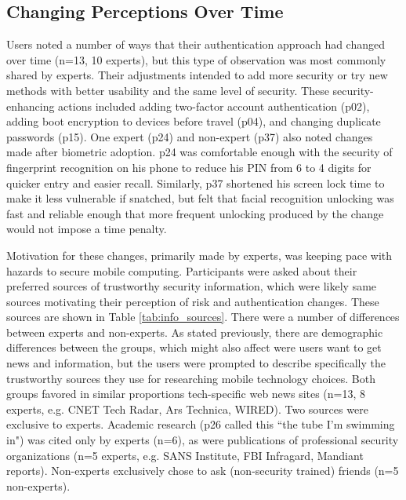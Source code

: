 \subsection{Changing Perceptions Over Time}
Users noted a number of ways that their authentication approach had changed over time (n=13, 10 experts), but this type of observation was most commonly shared by experts. Their adjustments intended to add more security or try new methods with better usability and the same level of security. These security-enhancing actions included adding two-factor account authentication (p02), adding boot encryption to devices before travel (p04), and changing duplicate passwords (p15). One expert (p24) and non-expert (p37) also noted changes made after biometric adoption. p24 was comfortable enough with the security of fingerprint recognition on his phone to reduce his PIN from 6 to 4 digits for quicker entry and easier recall. Similarly, p37 shortened his screen lock time to make it less vulnerable if snatched, but felt that facial recognition unlocking was fast and reliable enough that more frequent unlocking produced by the change would not impose a time penalty.  

Motivation for these changes, primarily made by experts, was keeping pace with hazards to secure mobile computing. Participants were asked about their preferred sources of trustworthy security information, which were likely same sources motivating their perception of risk and authentication changes. %
These sources are shown in Table \ref{tab:info_sources}. There were a number of differences between experts and non-experts. As stated previously, there are demographic differences between the groups, which might also affect were users want to get news and information, but the users were prompted to describe specifically the trustworthy sources they use for researching mobile technology choices. Both groups favored in similar proportions tech-specific web news sites (n=13, 8 experts, e.g. CNET Tech Radar, Ars Technica, WIRED). Two sources were exclusive to experts. Academic research (p26 called this ``the tube I'm swimming in") was cited only by experts (n=6), as were publications of professional security organizations (n=5 experts, e.g. SANS Institute, FBI Infragard, Mandiant reports). Non-experts exclusively chose to ask (non-security trained) friends (n=5 non-experts). 



